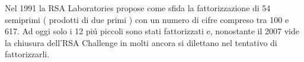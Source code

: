Nel 1991 la RSA Laboratories propose come sfida la fattorizzazione di 54 semiprimi ( prodotti di due primi ) con un numero di cifre compreso tra 100 e 617.
Ad oggi solo i 12 pi\'{u} piccoli sono stati fattorizzati e, nonostante il 2007 vide la chiusura dell'RSA Challenge in molti ancora si dilettano nel tentativo di fattorizzarli.




\lipsum[1]








\lipsum[1]




